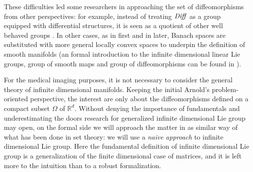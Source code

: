 These difficulties led some researchers in approaching the set of diffeomorphisms from other perspectives: 
for example, instead of treating $\text{\emph{Diff}}$ as a group equipped with differential structures, it is seen as a quotient of other well behaved groups \cite{wojtynski1994one}. In other cases, as in \cite{marsden1970hamiltonian} first and in \cite{milnor1984remarks} later, Banach spaces are substituted with more general locally convex spaces to underpin the definition of smooth manifolds (an formal introduction to the infinite dimensional linear Lie groups, group of smooth maps and group of diffeomorphisms can be found in \cite{neeb2006infinite}).

For the medical imaging purposes, it is not necessary to consider the general theory of infinite dimensional manifolds. Keeping the initial Arnold's problem-oriented perspective, the interest are only about the diffeomorphisms defined on a compact subset $\Omega$ of $\mathbb{R}^d$. Without denying the importance of fundamentals and underestimating the doors research for generalized infinite dimensional Lie group may open, on the formal side we will approach the matter in as similar way of what has been done in set theory: we will use a \emph{naive approach} to infinite dimensional Lie group. Here the fundamental definition of infinite dimensional Lie group is a generalization of the finite dimensional case of matrices, and it is left more to the intuition than to a robust formalization. 









